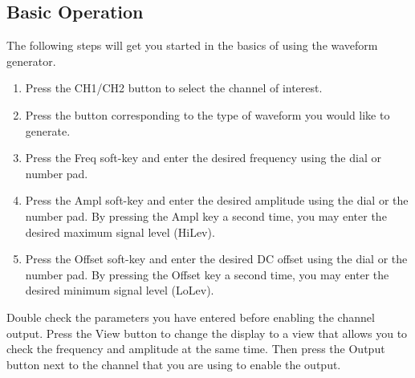 \subsection{Basic Operation}
The following steps will get you started in the basics of using the waveform generator.
\begin{enumerate}
\item Press the CH1/CH2 button to select the channel of interest.
\item Press the button corresponding to the type of waveform you would like to generate.
\item Press the Freq soft-key and enter the desired frequency using the dial or number pad.
\item Press the Ampl soft-key and enter the desired amplitude using the dial or the number pad. By pressing the Ampl key a second time, you may enter the desired maximum signal level (HiLev).
\item Press the Offset soft-key and enter the desired DC offset using the dial or the number pad. By pressing the Offset key a second time, you may enter the desired minimum signal level (LoLev).
\end{enumerate}
Double check the parameters you have entered before enabling the channel output. Press the View button to change the display to a view that allows you to check the frequency and amplitude at the same time. Then press the Output button next to the channel that you are using to enable the output.
